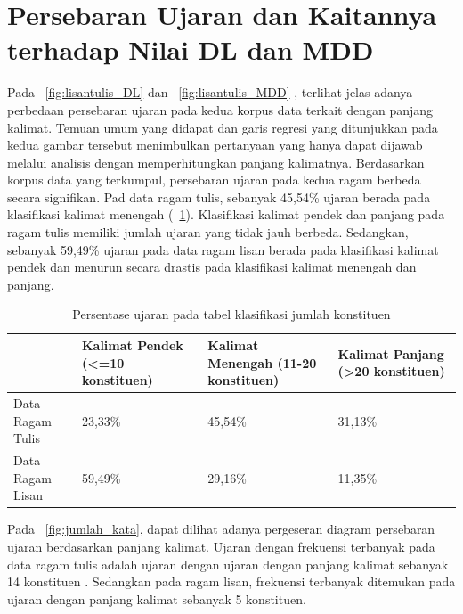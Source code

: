 \section{Persebaran Ujaran dan Kaitannya terhadap Nilai DL dan MDD}
Pada \pic~\ref{fig:lisantulis_DL}  dan \pic~\ref{fig:lisantulis_MDD} , terlihat jelas adanya perbedaan persebaran ujaran pada kedua korpus data terkait dengan panjang kalimat. Temuan umum yang didapat dan garis regresi yang ditunjukkan pada kedua gambar tersebut menimbulkan pertanyaan yang hanya dapat dijawab melalui analisis dengan memperhitungkan panjang kalimatnya. Berdasarkan korpus data yang terkumpul, persebaran ujaran pada kedua ragam berbeda secara signifikan. Pad data ragam tulis, sebanyak 45,54\% ujaran berada pada klasifikasi kalimat menengah (\tab~\ref{tab:presentase_ujaran}). Klasifikasi kalimat pendek dan panjang pada ragam tulis memiliki jumlah ujaran yang tidak jauh berbeda. Sedangkan, sebanyak 59,49\% ujaran pada data ragam lisan berada pada klasifikasi kalimat pendek dan menurun secara drastis pada klasifikasi kalimat menengah dan panjang.

\begin{table}
\begin{center}
\begin{small}
   \caption{Persentase ujaran pada tabel klasifikasi jumlah konstituen}  \label{tab:presentase_ujaran}
  \begin{tabular}{ |p{3cm} | p{3cm} | p{3cm} | p{3cm} |}
    \hline
 & Kalimat Pendek \newline (\textless=10 konstituen) & Kalimat Menengah (11-20 konstituen) & Kalimat Panjang (\textgreater20 konstituen) \\ \hline
Data Ragam Tulis & 23,33\% & 45,54\% & 31,13\% \\ \hline
Data Ragam Lisan & 59,49\% & 29,16\% & 11,35\% \\ \hline
  \end{tabular}
  \end{small}
\end{center}
\end{table}


Pada \pic~\ref{fig:jumlah_kata}, dapat dilihat adanya pergeseran diagram persebaran ujaran berdasarkan panjang kalimat. Ujaran dengan frekuensi terbanyak pada data ragam tulis adalah ujaran dengan ujaran dengan panjang kalimat sebanyak 14 konstituen . Sedangkan pada ragam lisan, frekuensi terbanyak ditemukan pada ujaran dengan panjang kalimat sebanyak 5 konstituen. 

